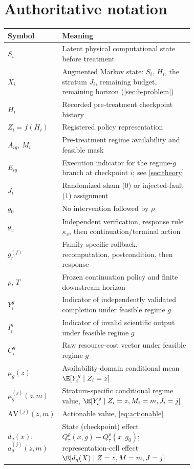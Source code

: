 \section{Authoritative notation}
\label{app:b-notation}
\label{app:notation}

\begin{table}[H]
\centering
\small
\begin{tabular}{@{}lp{0.72\linewidth}@{}}
\toprule
Symbol & Meaning \\
\midrule
$S_i$ & Latent physical computational state before treatment \\
$X_i$ & Augmented Markov state: $S_i$, $H_i$, the stratum $J_i$, remaining budget, remaining horizon (\cref{sec:b-problem}) \\
$H_i$ & Recorded pre-treatment checkpoint history \\
$Z_i=f(H_i)$ & Registered policy representation \\
$A_{ig}$, $M_i$ & Pre-treatment regime availability and feasible mask \\
$E_{ig}$ & Execution indicator for the regime-$g$ branch at checkpoint $i$; see \cref{sec:theory} \\
$J_i$ & Randomized sham ($0$) or injected-fault ($1$) assignment \\
$g_0$ & No intervention followed by $\rho$ \\
$g_v$ & Independent verification, response rule $\kappa_v$, then continuation/terminal action \\
$g_r^{(f)}$ & Family-specific rollback, recomputation, postcondition, then response \\
$\rho$, $T$ & Frozen continuation policy and finite downstream horizon \\
$Y_i^g$ & Indicator of independently validated completion under feasible regime $g$ \\
$I_i^g$ & Indicator of invalid scientific output under feasible regime $g$ \\
$C_i^g$ & Raw resource-cost vector under feasible regime $g$ \\
$\mu_g(z)$ & Availability-domain conditional mean $\E[Y_i^g\mid Z_i=z]$ \\
$\mu^{(j)}_g(z,m)$ & Stratum-specific conditional regime value, $\E[Y_i^g\mid Z_i=z,M_i=m,J_i=j]$ \\
$\mathrm{AV}^{(j)}(z,m)$ & Actionable value, \eqref{eq:actionable} \\
$d_g(x)$; $a^{(j)}_g(z,m)$ & State (checkpoint) effect $Q^\rho_\tau(x,g)-Q^\rho_\tau(x,g_0)$; representation-cell effect $\E[d_g(X)\mid Z=z,M=m,J=j]$ \\

\end{tabular}
\end{table}
